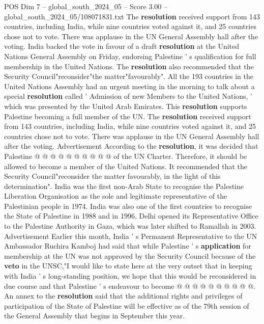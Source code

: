 \begin{textsample}{POS Dim 7 – global\_south\_2024\_05 – Score 3.00 – global\_south\_2024\_05/108071831.txt}  \label{ex:f7_pos_063}
The \textbf{resolution} received support from 143 countries, including India, while nine countries voted against it, and 25 countries chose not to vote.
There was applause in the UN General Assembly hall after the voting.
India backed the vote in favour of a draft \textbf{resolution} at the United Nations General Assembly on Friday, endorsing Palestine ' s qualification for full membership in the United Nations.
The \textbf{resolution} also recommended that the Security Council"reconsider"the matter"favourably".
All the 193 countries in the United Nations Assembly had an urgent meeting in the morning to talk about a special \textbf{resolution} called ' Admission of new Members to the United Nations, ' which was presented by the United Arab Emirates.
This \textbf{resolution} supports Palestine becoming a full member of the UN.
The \textbf{resolution} received support from 143 countries, including India, while nine countries voted against it, and 25 countries chose not to vote.
There was applause in the UN General Assembly hall after the voting.
Advertisement According to the \textbf{resolution}, it was decided that Palestine @ @ @ @ @ @ @ @ @ @ of the UN Charter.
Therefore, it should be allowed to become a member of the United Nations.
It recommended that the Security Council"reconsider the matter favourably, in the light of this determination".
India was the first non-Arab State to recognise the Palestine Liberation Organisation as the sole and legitimate representative of the Palestinian people in 1974.
India was also one of the first countries to recognise the State of Palestine in 1988 and in 1996, Delhi opened its Representative Office to the Palestine Authority in Gaza, which was later shifted to Ramallah in 2003.
Advertisement Earlier this month, India ' s Permanent Representative to the UN Ambassador Ruchira Kamboj had said that while Palestine ' s \textbf{application} for membership at the UN was not approved by the Security Council because of the \textbf{veto} in the UNSC,"I would like to state here at the very outset that in keeping with India ' s long-standing position, we hope that this would be reconsidered in due course and that Palestine ' s endeavour to become @ @ @ @ @ @ @ @ @ @.
An annex to the \textbf{resolution} said that the additional rights and privileges of participation of the State of Palestine will be effective as of the 79th session of the General Assembly that begins in September this year.

\end{textsample}

